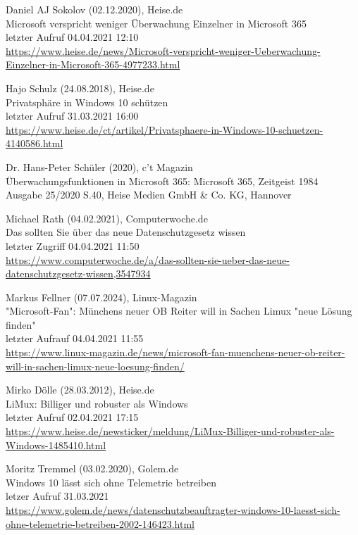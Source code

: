 \begin{thebibliography}{9}
    \bibitem{}
        Daniel AJ Sokolov (02.12.2020), Heise.de
        \\Microsoft verspricht weniger Überwachung Einzelner in Microsoft 365
        \\letzter Aufruf 04.04.2021 12:10
        \\\url{https://www.heise.de/news/Microsoft-verspricht-weniger-Ueberwachung-Einzelner-in-Microsoft-365-4977233.html}

    \bibitem{}
        Hajo Schulz (24.08.2018), Heise.de
        \\Privatsphäre in Windows 10 schützen
        \\letzter Aufruf 31.03.2021 16:00
        \\\url{https://www.heise.de/ct/artikel/Privatsphaere-in-Windows-10-schuetzen-4140586.html}

    \bibitem{}
        Dr. Hans-Peter Schüler (2020), c't Magazin
        \\Überwachungsfunktionen in Microsoft 365: Microsoft 365, Zeitgeist 1984
        \\Ausgabe 25/2020 S.40, Heise Medien GmbH \& Co. KG, Hannover

    \bibitem{}
        Michael Rath (04.02.2021), Computerwoche.de
        \\Das sollten Sie über das neue Datenschutzgesetz wissen
        \\letzter Zugriff 04.04.2021 11:50
        \\\url{https://www.computerwoche.de/a/das-sollten-sie-ueber-das-neue-datenschutzgesetz-wissen,3547934}

    \bibitem{}
        Markus Fellner (07.07.2024), Linux-Magazin
        \\"Microsoft-Fan": Münchens neuer OB Reiter will in Sachen Limux "neue Lösung finden"
        \\letzter Aufrauf 04.04.2021 11:55
        \\\url{https://www.linux-magazin.de/news/microsoft-fan-muenchens-neuer-ob-reiter-will-in-sachen-limux-neue-loesung-finden/}

    \bibitem{}
        Mirko Dölle (28.03.2012), Heise.de
        \\LiMux: Billiger und robuster als Windows
        \\letzter Aufruf 02.04.2021 17:15
        \\\url{https://www.heise.de/newsticker/meldung/LiMux-Billiger-und-robuster-als-Windows-1485410.html}

    \bibitem{}
        Moritz Tremmel (03.02.2020), Golem.de
        \\Windows 10 lässt sich ohne Telemetrie betreiben
        \\letzer Aufruf 31.03.2021
        \\\url{https://www.golem.de/news/datenschutzbeauftragter-windows-10-laesst-sich-ohne-telemetrie-betreiben-2002-146423.html}


\end{thebibliography}
